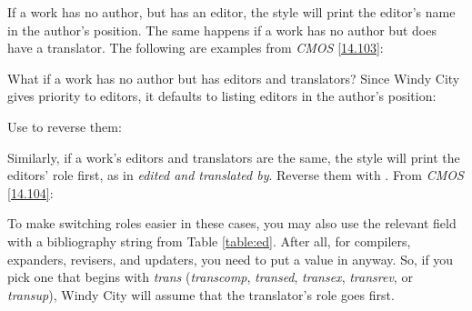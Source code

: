 \documentclass[11pt,letterpaper,oneside]{article}
\begin{document}
\begin{citebib}
\item \cite{doe2010a}
\end{citebib}
\begin{citebib}
\item \cite{doe2010b}
\end{citebib}

If a work has no author, but has an editor, the style will print the
editor's name in the author's position. The same happens if a work has
no author but does have a translator. The following are examples from
\textit{CMOS} \ref{14.103}:

\begin{citebib}
\item \cite[100]{egan2014}
\item \cite[34]{silverstein1974}
\end{citebib}

What if a work has no author but has editors and translators? Since
Windy City gives priority to editors, it defaults to listing editors
in the author's position:

\begin{citebib}
\item \cite{smith2002a}
\end{citebib}

\noindent Use  to reverse them:

\begin{citebib}
\item \cite{smith2002b}
\end{citebib}

Similarly, if a work's editors and translators are the same, the style
will print the editors' role first, as in \textit{edited and
translated by}. Reverse them with . From \textit{CMOS}
\ref{14.104}:

\begin{citebib}
\item \cite{menchu1999}
\end{citebib}

To make switching roles easier in these cases, you may also use the
relevant  field with a bibliography string from
Table \ref{table:ed}. After all, for compilers, expanders, revisers,
and updaters, you need to put a value in  anyway.
So, if you pick one that begins with \textit{trans}
(\textit{transcomp}, \textit{transed}, \textit{transex},
\textit{transrev}, or \textit{transup}), Windy City will assume that
the translator's role goes first.
\end{document}
